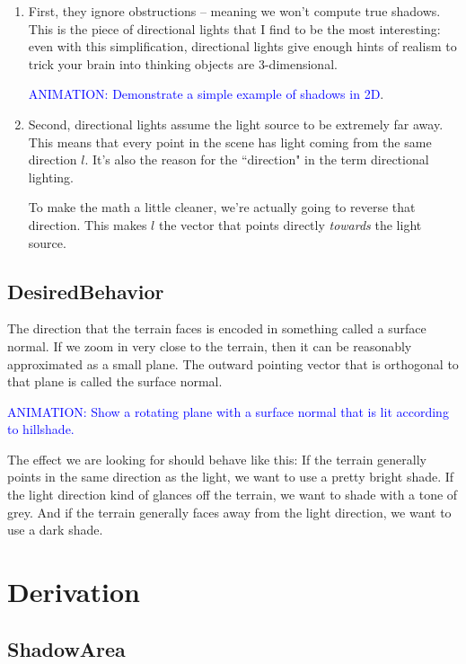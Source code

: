 \documentclass{article}
\newcommand\animation[1]{\textcolor{blue}{ANIMATION: #1}}
\begin{document}
\begin{enumerate}

\item First, they ignore obstructions -- meaning we won't compute true shadows.
This is the piece of directional lights that I find to be the most interesting: even with this simplification, directional lights give enough hints of realism to trick your brain into thinking objects are 3-dimensional.

\animation{Demonstrate a simple example of shadows in 2D}.
	
\item Second, directional lights assume the light source to be extremely far away.
This means that every point in the scene has light coming from the same direction $l$.
It's also the reason for the ``direction" in the term directional lighting.

To make the math a little cleaner, we're actually going to reverse that direction.
This makes $l$ the vector that points directly \textit{towards} the light source.

\end{enumerate}

\subsection{DesiredBehavior}

The direction that the terrain faces is encoded in something called a surface normal.
If we zoom in very close to the terrain, then it can be reasonably approximated as a small plane.
The outward pointing vector that is orthogonal to that plane is called the surface normal.

\animation{Show a rotating plane with a surface normal that is lit according to hillshade.}

The effect we are looking for should behave like this:
If the terrain generally points in the same direction as the light, we want to use a pretty bright shade.
If the light direction kind of glances off the terrain, we want to shade with a tone of grey.
And if the terrain generally faces away from the light direction, we want to use a dark shade.

\section{Derivation}

\subsection{ShadowArea}
\end{document}
